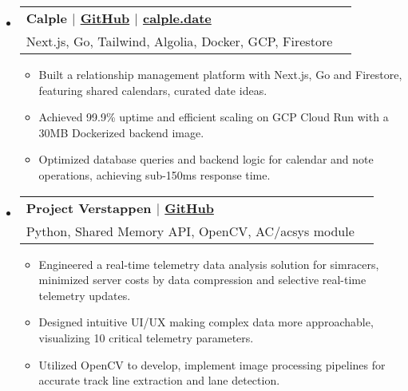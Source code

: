 \documentclass[letterpaper,11pt]{article}
\makeatletter
\newcommand{\resumeItem}[1]{
  \item{
    {#1}
  }
}
\newcommand{\resumeSubheading}[4]{
    \item
    \begin{tabular*}{0.985\textwidth}[t]{l@{\extracolsep{\fill}}r@{\hspace{-0.1in}}}
        {\textbf{#1}} & {#2} \\
        #3 &  #4 \\
    \end{tabular*}\vspace{-5pt}
}
\newcommand{\resumeSubHeadingListStart}{\begin{itemize}[leftmargin=0.00in, rightmargin=-0.2in, label={}]\vspace{3pt}}
\newcommand{\resumeSubHeadingListEnd}{\end{itemize}\vspace{-5pt}}
\newcommand{\resumeItemListStart}{\vspace{3pt}\begin{itemize}[leftmargin=0.15in, rightmargin=0.15in]}
\newcommand{\resumeItemListEnd}{\end{itemize}\vspace{-5pt}}
\makeatother
\begin{document}

\resumeSubHeadingListStart
\resumeSubheading
{\textbf{Calple} \textnormal{$|$ \href{https://github.com/juhun32/calple}{GitHub} $|$ \href{https://www.calple.date}{calple.date}}} {}
{{Next.js, Go, Tailwind, Algolia, Docker, GCP, Firestore}}{}
\resumeItemListStart
\resumeItem{Built a relationship management platform with Next.js, Go and Firestore, featuring shared calendars, curated date ideas.}
\resumeItem{Achieved 99.9\% uptime and efficient scaling on GCP Cloud Run with a 30MB Dockerized backend image.}
\resumeItem{Optimized database queries and backend logic for calendar and note operations, achieving sub-150ms response time.}
\resumeItemListEnd
\resumeSubHeadingListEnd

\resumeSubHeadingListStart
\resumeSubheading
{\textbf{Project Verstappen} \textnormal{$|$ \href{https://github.com/juhun32/project-verstappen}{GitHub}}} {}
{{Python, Shared Memory API, OpenCV, AC/acsys module}}{}
\resumeItemListStart
\resumeItem{Engineered a real-time telemetry data analysis solution for simracers, minimized server costs by data compression and selective real-time telemetry updates.}
\resumeItem{Designed intuitive UI/UX making complex data more approachable, visualizing 10 critical telemetry parameters.}
\resumeItem{Utilized OpenCV to develop, implement image processing pipelines for accurate track line extraction and lane detection.}
\resumeItemListEnd
\resumeSubHeadingListEnd
\end{document}
